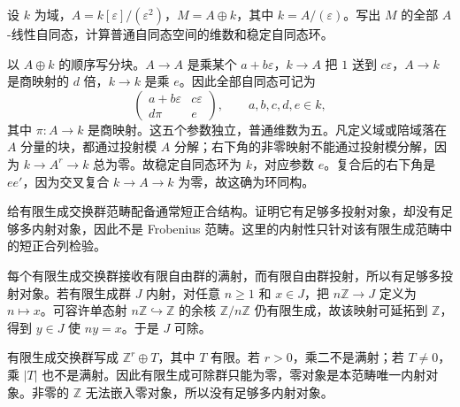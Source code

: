 \begin{exercise}\label{b4:ex:D-dual-number-block-maps}
	设 \(k\) 为域，\(A=k[\varepsilon]/(\varepsilon^2)\)，\(M=A\oplus k\)，其中 \(k=A/(\varepsilon)\)。写出 \(M\) 的全部 \(A\)-线性自同态，计算普通自同态空间的维数和稳定自同态环。
\end{exercise}
\begin{solution}
	以 \(A\oplus k\) 的顺序写分块。\(A\to A\) 是乘某个 \(a+b\varepsilon\)，\(k\to A\) 把 \(1\) 送到 \(c\varepsilon\)，\(A\to k\) 是商映射的 \(d\) 倍，\(k\to k\) 是乘 \(e\)。因此全部自同态可记为
	\[
		\begin{pmatrix}
			a+b\varepsilon&c\varepsilon\\
			d\pi&e
		\end{pmatrix},
		\qquad a,b,c,d,e\in k,
	\]
	其中 \(\pi:A\to k\) 是商映射。这五个参数独立，普通维数为五。凡定义域或陪域落在 \(A\) 分量的块，都通过投射模 \(A\) 分解；右下角的非零映射不能通过投射模分解，因为 \(k\to A^r\to k\) 总为零。故稳定自同态环为 \(k\)，对应参数 \(e\)。复合后的右下角是 \(ee'\)，因为交叉复合 \(k\to A\to k\) 为零，故这确为环同构。
\end{solution}

\begin{exercise}\label{b4:ex:D-no-enough-injectives}
	给有限生成交换群范畴配备通常短正合结构。证明它有足够多投射对象，却没有足够多内射对象，因此不是 Frobenius 范畴。这里的内射性只针对该有限生成范畴中的短正合列检验。
\end{exercise}
\begin{solution}
	每个有限生成交换群接收有限自由群的满射，而有限自由群投射，所以有足够多投射对象。若有限生成群 \(J\) 内射，对任意 \(n\ge1\) 和 \(x\in J\)，把 \(n\mathbb Z\to J\) 定义为 \(n\mapsto x\)。可容许单态射 \(n\mathbb Z\hookrightarrow\mathbb Z\) 的余核 \(\mathbb Z/n\mathbb Z\) 仍有限生成，故该映射可延拓到 \(\mathbb Z\)，得到 \(y\in J\) 使 \(ny=x\)。于是 \(J\) 可除。

	有限生成交换群写成 \(\mathbb Z^r\oplus T\)，其中 \(T\) 有限。若 \(r>0\)，乘二不是满射；若 \(T\ne0\)，乘 \(|T|\) 也不是满射。因此有限生成可除群只能为零，零对象是本范畴唯一内射对象。非零的 \(\mathbb Z\) 无法嵌入零对象，所以没有足够多内射对象。
\end{solution}

